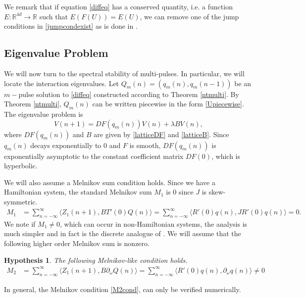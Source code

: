 \documentclass[12pt]{elsarticle}
\def\R{{\mathbb R}}
\newtheorem{hypothesis}{Hypothesis}
\begin{document}
\noindent We remark that if equation \eqref{diffeq} has a conserved quantity, i.e. a function $E: \R^{4d} \rightarrow \R$ such that $E(F(U)) = E(U)$, we can remove one of the jump conditions in \eqref{jumpcondexist} as is done in \cite{SandstedeStrut}.

\subsection{Eigenvalue Problem}

We will now turn to the spectral stability of multi-pulses. In particular, we will locate the interaction eigenvalues. Let $Q_m(n) = (q_m(n), q_m(n-1))$ be an $m-$pulse solution to \eqref{diffeq} constructed according to Theorem \ref{ntmulti}. By Theorem \ref{ntmulti}, $Q_m(n)$ can be written piecewise in the form \eqref{Upiecewise}. The eigenvalue problem is
\begin{equation}\label{multiEVP}
V(n+1) = DF(q_m(n)) V(n) + \lambda B V(n),
\end{equation}
where $DF(q_m(n))$ and $B$ are given by \eqref{latticeDF} and \eqref{latticeB}. Since $q_m(n)$ decays exponentially to 0 and $F$ is smooth, $DF(q_m(n))$ is exponentially asymptotic to the constant coefficient matrix $DF(0)$, which is hyperbolic.

We will also assume a Melnikov sum condition holds. Since we have a Hamiltonian system, the standard Melnikov sum $M_1$ is 0 since $J$ is skew-symmetric.
\begin{align}\label{MelnikovM1zero}
M_1 &= \sum_{n=-\infty}^\infty \langle Z_1(n+1), B T'(0)Q(n) \rangle
= \sum_{n=-\infty}^\infty \langle R'(0)q(n), J R'(0)q(n) \rangle
= 0.
\end{align}
We note if $M_1 \neq 0$, which can occur in non-Hamiltonian systems, the analysis is much simpler and in fact is the discrete analogue of \cite{Sandstede1998}. We will assume that the following higher order Melnikov sum is nonzero.

\begin{hypothesis}\label{melnikovhyp}
The following Melnikov-like condition holds.
\begin{align}\label{M2cond}
M_2 &= \sum_{n=-\infty}^\infty \langle Z_1(n+1), B \partial_\omega Q(n) \rangle = \sum_{n=-\infty}^\infty \langle R'(0) q(n), \partial_\omega q(n) \rangle \neq 0
\end{align}
\end{hypothesis}
\noindent In general, the Melnikov condition \eqref{M2cond}, can only be verified numerically.
\end{document}
